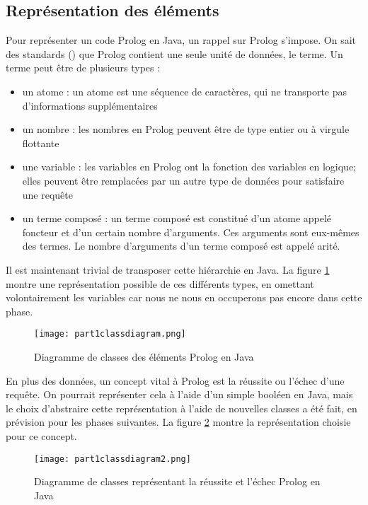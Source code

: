 \documentclass[../report.tex]{subfiles}
\begin{document}
\subsection{Représentation des éléments}
\label{subsec:prologRules}
Pour représenter un code Prolog en Java, un rappel sur Prolog s'impose. On sait des standards (\cite{PrologSyntax}) que Prolog contient une seule unité de données, le terme. Un terme peut être de plusieurs types :
\begin{itemize}
    \item un atome : un atome est une séquence de caractères, qui ne transporte pas d'informations supplémentaires
    \item un nombre : les nombres en Prolog peuvent être de type entier ou à virgule flottante
    \item une variable : les variables en Prolog ont la fonction des variables en logique; elles peuvent être remplacées par un autre type de données pour satisfaire une requête
    \item un terme composé : un terme composé est constitué d'un atome appelé foncteur et d'un certain nombre d'arguments. Ces arguments sont eux-mêmes des termes. Le nombre d'arguments d'un terme composé est appelé arité.
\end{itemize}
Il est maintenant trivial de transposer cette hiérarchie en Java. La figure \ref{fig:part1classdiagram} montre une représentation possible de ces différents types, en omettant volontairement les variables car nous ne nous en occuperons pas encore dans cette phase.
\begin{figure}[h]
    \centering
    \texttt{[image: part1classdiagram.png]}
    \caption{Diagramme de classes des éléments Prolog en Java}
    \label{fig:part1classdiagram}
\end{figure}

En plus des données, un concept vital à Prolog est la réussite ou l'échec d'une requête. On pourrait représenter cela à l'aide d'un simple booléen en Java, mais le choix d'abstraire cette représentation à l'aide de nouvelles classes a été fait, en prévision pour les phases suivantes. La figure \ref{fig:part1classdiagram2} montre la représentation choisie pour ce concept.
\begin{figure}[h]
    \centering
    \texttt{[image: part1classdiagram2.png]}
    \caption{Diagramme de classes représentant la réussite et l'échec Prolog en Java}
    \label{fig:part1classdiagram2}
\end{figure}
\end{document}
